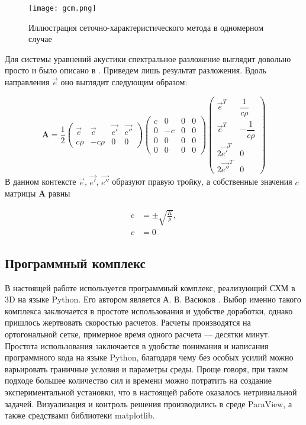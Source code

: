 \begin{figure}[H]
	\centering
	\texttt{[image: gcm.png]}
	\caption{Иллюстрация сеточно-характеристического метода в одномерном случае}
	\label{fig:gcm}
\end{figure}

Для системы уравнений акустики спектральное разложение выглядит довольно просто и было описано в \cite{kazakov}. Приведем лишь результат разложения. Вдоль направления $\vec{e}$ оно выглядит следующим образом:

\begin{equation}
	\mathbf{A} = \frac{1}{2}
	\begin{pmatrix}
		\vec{e} & \vec{e} & \vec{e'} & \vec{e''} \\
		c\rho & -c\rho & 0 & 0
	\end{pmatrix}
	\begin{pmatrix}
		c & 0 & 0 & 0 \\
		0 & -c & 0 & 0 \\
		0 & 0 & 0 & 0 \\
		0 & 0 & 0 & 0
	\end{pmatrix}
	\begin{pmatrix}
		\vec{e}^T & \dfrac{1}{c\rho} \\
		\vec{e}^T & -\dfrac{1}{c\rho} \\
		2\vec{e'}^T & 0 \\
		2\vec{e''}^T & 0
	\end{pmatrix}
\end{equation}
В данном контексте $\vec{e}$, $\vec{e'}$, $\vec{e''}$ образуют правую тройку, а собственные значения $c$ матрицы $\mathbf{A}$ равны

\begin{equation}
	\begin{aligned}
		c &= \pm \sqrt{\frac{K}{\rho}}, \\
		c &= 0
	\end{aligned}
\end{equation}

\subsection{Программный комплекс}
В настоящей работе используется программный комплекс, реализующий СХМ в 3D на языке Python. Его автором является А. В. Васюков \cite{gcm}. Выбор именно такого комплекса заключается в простоте использования и удобстве доработки, однако пришлось жертвовать скоростью расчетов. Расчеты производятся на ортогональной сетке, примерное время одного расчета --- десятки минут. Простота использования заключается в удобстве понимания и написания программного кода на языке Python, благодаря чему без особых усилий можно варьировать граничные условия и параметры среды. Проще говоря, при таком подходе большее количество сил и времени можно потратить на создание экспериментальной установки, что в настоящей работе оказалось нетривиальной задачей. Визуализация и контроль решения производились в среде ParaView, а также средствами библиотеки matplotlib.

\newpage
